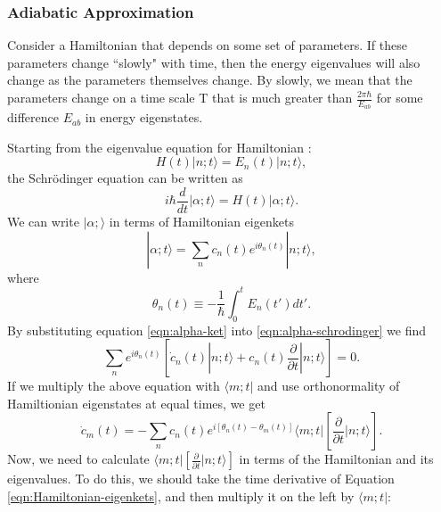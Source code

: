 \subsubsection{Adiabatic Approximation}
Consider a Hamiltonian that depends on some set of parameters. If
these parameters change ``slowly" with time, then the energy
eigenvalues will also change as the parameters themselves change. By
slowly, we mean that the parameters change on a time scale T that is
much greater than $\frac{2\pi \hbar}{E_{ab}}$ for some difference
$E_{ab}$ in energy eigenstates.

Starting from the eigenvalue equation for Hamiltonian :
%
\begin{equation}
\label{eqn:Hamiltonian-eigenkets}
H(t)  |n;t\rangle = E_n(t) |n;t\rangle ,
\end{equation}
the Schr\"{o}dinger equation can be written as
%
\begin{equation}
\label{eqn:alpha-schrodinger}
i \hbar \frac{d}{dt} |\alpha ; t \rangle = H(t) |\alpha ; t\rangle .
\end{equation}
%
We can write $|\alpha;\rangle$ in terms of Hamiltonian eigenkets
%
\begin{equation}
\label{eqn:alpha-ket}
|\alpha;t\rangle=\sum_n c_n(t) e^{i \theta_n(t)} |n;t\rangle ,
\end{equation}
%
where
%
\begin{equation}
\theta_n(t)\equiv-\frac{1}{\hbar} \int_0^t E_n(t') dt'.
\end{equation}
%
By substituting equation \ref{eqn:alpha-ket} into
\ref{eqn:alpha-schrodinger} we find
%
\begin{equation}
\sum_n e^{i \theta_n(t)} \left[ \dot{c}_n(t) |n;t \rangle +c_n(t) \frac{\partial}{\partial t} |n;t \rangle \right]=0.
\end{equation}
%
If we multiply the above equation with $\langle m;t|$ and use
orthonormality of Hamiltionian eigenstates at equal times, we get
%
\begin{equation}
\dot{c}_m(t)=-\sum_n c_n(t)e^{i \left[ \theta_n(t)-\theta_m(t)\right]} \langle m;t| \left[ \frac{\partial}{\partial t} |n;t \rangle \right] .
\end{equation}
%
Now, we need to calculate
$\langle m;t| \left[ \frac{\partial}{\partial t} |n;t \rangle \right]$
in terms of the Hamiltonian and its eigenvalues. To do this, we should
take the time derivative of Equation \ref{eqn:Hamiltonian-eigenkets},
and then multiply it on the left by $\langle m;t|$:

